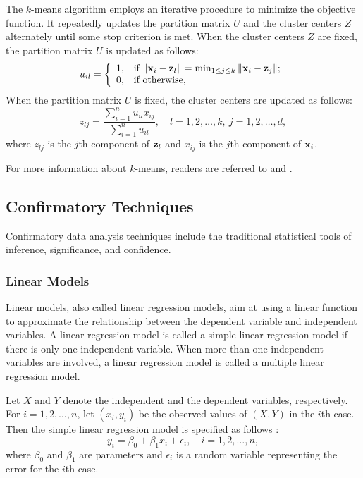 \documentclass[12pt]{article}
\newcommand{\bfx}[1]{{\bf #1}}
\begin{document}
The $k$-means algorithm employs an iterative procedure to minimize the objective function. It repeatedly updates the partition matrix $U$ and the cluster centers $Z$ alternately until some stop criterion is met. When the cluster centers $Z$ are fixed, the partition matrix $U$ is updated as follows:
\begin{equation}\label{eq:kmean-U}
u_{il}=\left\{
\begin{array}{ll}
1, & \hbox{if $\Vert \bfx{x}_i - \bfx{z}_l\Vert = \min_{1\le j\le k} \Vert \bfx{x}_i - \bfx{z}_j\Vert$;}\\
0, & \hbox{if otherwise},
\end{array}
\right.
\end{equation}
When the partition matrix $U$ is fixed, the cluster centers are updated as follows:
\begin{equation}\label{eq:kmean-Z}
z_{lj} = \dfrac{\sum_{i=1}^n u_{il} x_{ij} } { \sum_{i=1}^n u_{il}},\quad l=1,2,\ldots,k,\: j=1,2,\ldots,d,
\end{equation}
where $z_{lj}$ is the $j$th component of $\bfx{z}_l$ and $x_{ij}$ is the $j$th component of $\bfx{x}_i$.

For more information about $k$-means, readers are referred to \citep{gan2007} and \citep{mirkin2011}.

\subsection{Confirmatory Techniques}

Confirmatory data analysis techniques include the traditional statistical tools of inference, significance, and confidence.

\subsubsection{Linear Models}

Linear models, also called linear regression models, aim at using a linear function to approximate the relationship between the dependent variable and independent variables. A linear regression model is called a simple linear regression model if there is only one independent variable. When more than one independent variables are involved, a linear regression model is called a multiple linear regression model.

Let $X$ and $Y$ denote the independent and the dependent variables, respectively. For $i=1,2,\ldots,n$, let $(x_i, y_i)$ be the observed values of $(X,Y)$ in the $i$th case.  Then the simple linear regression model is specified as follows \citep{frees2009}:
\begin{equation}\label{eq:basiclm-model}
y_i  = \beta_0 + \beta_1 x_i + \epsilon_i,\quad i=1,2,\ldots,n,
\end{equation}
where $\beta_0$ and $\beta_1$ are parameters and $\epsilon_i$ is a random variable representing the error for the $i$th case. 
\end{document}
